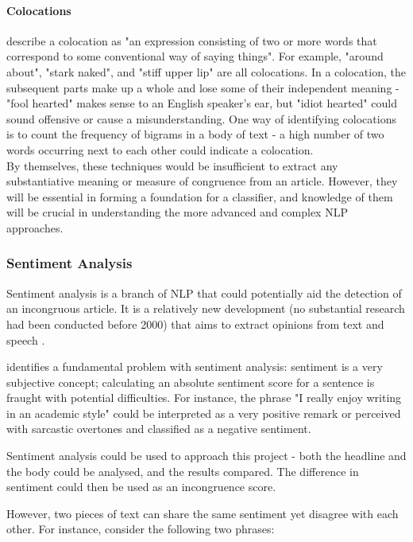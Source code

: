 \paragraph{Colocations}
\citeauthor{manning1999} describe a colocation as "an expression consisting of two or more words that correspond to some conventional way of saying things". For example, "around about", "stark naked", and "stiff upper lip" are all colocations. In a colocation, the subsequent parts make up a whole and lose some of their independent meaning - "fool hearted" makes sense to an English speaker's ear, but "idiot hearted" could sound offensive or cause a misunderstanding.
	One way of identifying colocations is to count the frequency of bigrams in a body of text - a high number of two words occurring next to each other could indicate a colocation. \\

By themselves, these techniques would be insufficient to extract any substantiative meaning or measure of congruence from an article. However, they will be essential in forming a foundation for a classifier, and knowledge of them will be crucial in understanding the more advanced and complex NLP approaches.

\subsubsection{Sentiment Analysis}\label{lit:sentiment-analysis}
Sentiment analysis is a branch of NLP that could potentially aid the detection of an incongruous article. It is a relatively new development (no substantial research had been conducted before 2000) that aims to extract opinions from text and speech \cite{liu2012}.

 identifies a fundamental problem with sentiment analysis: sentiment is a very subjective concept; calculating an absolute sentiment score for a sentence is fraught with potential difficulties. For instance, the phrase "I really enjoy writing in an academic style" could be interpreted as a very positive remark or perceived with sarcastic overtones and classified as a negative sentiment.

Sentiment analysis could be used to approach this project - both the headline and the body could be analysed, and the results compared. The difference in sentiment could then be used as an incongruence score.

However, two pieces of text can share the same sentiment yet disagree with each other. For instance, consider the following two phrases:

